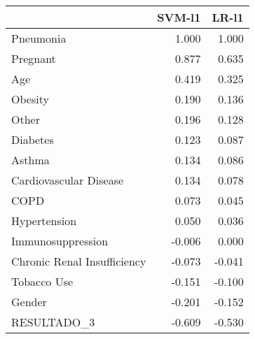 \begin{tabular}{lrr}
\toprule
{} &  SVM-l1 &  LR-l1 \\
\midrule
Pneumonia                   &   1.000 &  1.000 \\
Pregnant                    &   0.877 &  0.635 \\
Age                         &   0.419 &  0.325 \\
Obesity                     &   0.190 &  0.136 \\
Other                       &   0.196 &  0.128 \\
Diabetes                    &   0.123 &  0.087 \\
Asthma                      &   0.134 &  0.086 \\
Cardiovascular Disease      &   0.134 &  0.078 \\
COPD                        &   0.073 &  0.045 \\
Hypertension                &   0.050 &  0.036 \\
Immunosuppression           &  -0.006 &  0.000 \\
Chronic Renal Insufficiency &  -0.073 & -0.041 \\
Tobacco Use                 &  -0.151 & -0.100 \\
Gender                      &  -0.201 & -0.152 \\
RESULTADO\_3                 &  -0.609 & -0.530 \\
\bottomrule
\end{tabular}
